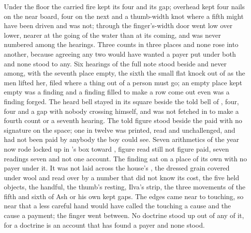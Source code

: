 Under the floor the carried fire kept its four and its gap; overhead  kept four nails on the near board, four on the next and a thumb-width knot where a fifth might have been driven and was not; through the finger's-width door  went low over lower, nearer at the going of the water than at its coming, and was never numbered among the hearings. Three counts in three places and none rose into another, because agreeing any two would have wanted a payer put under both and none stood to any. Six hearings of the full note stood beside and never among, with the seventh place empty, the sixth the small flat knock out of  as the men lifted her, filed where a thing out of a person must go; an empty place kept empty was a finding and a finding filled to make a row come out even was a finding forged. The heard bell stayed in its square beside the told bell of , four, four and a gap with nobody crossing himself, and was not fetched in to make a fourth count or a seventh hearing. The told figure stood beside the paid with no signature on the space; one in twelve was printed, read and unchallenged, and had not been paid by anybody the boy could see. Seven arithmetics of the year now rode locked up  in 's box toward , figure read still not figure paid, seven readings seven and not one account. The finding sat on a place of its own with no payer under it. It was not laid across the house's , the dressed grain covered under wool and read over by a number that did not know its cost, the five held objects, the handful, the thumb's resting, Ilva's strip, the three movements of the fifth and sixth of Ash or his own kept gaps. The edges came near to touching, so near that a less careful hand would have called the touching a cause and the cause a payment; the finger went between. No doctrine stood up out of any of it, for a doctrine is an account that has found a payer and none stood.

\scenebreak

